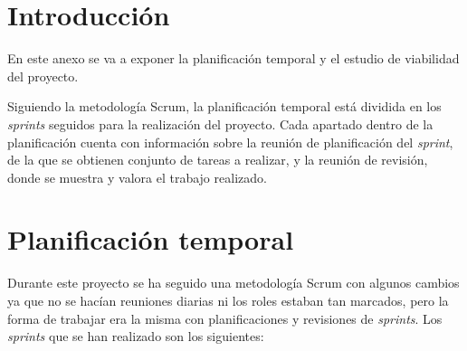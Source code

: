 
\section{Introducción}
En este anexo se va a exponer la planificación temporal y el estudio de viabilidad del proyecto.

Siguiendo la metodología Scrum, la planificación temporal está dividida en los \textit{sprints} seguidos para la realización del proyecto.
Cada apartado dentro de la planificación cuenta con información sobre la reunión de planificación del \textit{sprint}, de la que se obtienen conjunto de tareas a realizar, y la reunión de revisión, donde se muestra y valora el trabajo realizado.

\section{Planificación temporal}
Durante este proyecto se ha seguido una metodología Scrum con algunos cambios ya que no se hacían reuniones diarias ni los roles estaban tan marcados, pero la forma de trabajar era la misma con planificaciones y revisiones de \textit{sprints}.
Los \textit{sprints} que se han realizado son los siguientes:

